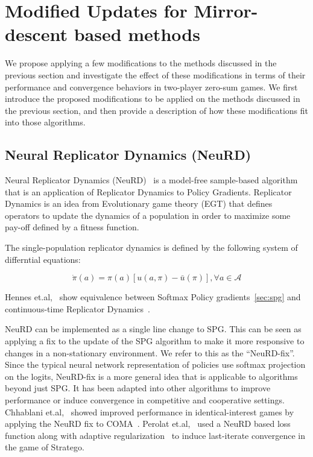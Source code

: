 \chapter{Modified Updates for Mirror-descent based methods}

We propose applying a few modifications to the methods discussed in the previous section and
investigate the effect of these modifications in terms of their performance and convergence
behaviors in two-player zero-sum games.
We first introduce the proposed modifications to be applied on the methods discussed in the
previous section, and then provide a description of how these modifications fit into those
algorithms.

\section{Neural Replicator Dynamics (NeuRD)}
Neural Replicator Dynamics (NeuRD)~\cite{hennesNeural2020} is a model-free sample-based algorithm
that is an application of Replicator Dynamics to Policy Gradients.
Replicator Dynamics is an idea from Evolutionary game theory (EGT) that defines operators to update
the dynamics of a population in order to maximize some pay-off defined by a fitness function.

The single-population replicator dynamics is defined by the following system of differntial
equations:

\begin{equation}
	\label{eqn:rd} \dot{\pi}(a) = \pi(a)[u(a, \pi) -
		\bar{u}(\pi)], \forall a \in \mathcal{A}
\end{equation}

Hennes
et.al,~\cite{hennesNeural2020} show equivalence between Softmax Policy gradients~\ref{sec:spg} and
continuous-time Replicator Dynamics~\cite[THEOREM 1, on p5]{hennesNeural2020}\label{thm:spgrd}.

NeuRD can be implemented as a single line change to SPG.
This can be seen as applying a fix to the update of the SPG algorithm to make it more responsive to
changes in a non-stationary environment.
We refer to this as the ``NeuRD-fix''.
Since the typical neural network representation of policies use softmax projection on the logits,
NeuRD-fix is a more general idea that is applicable to algorithms beyond just SPG.
It has been adapted into other algorithms to improve performance or induce convergence in
competitive and cooperative settings.
Chhablani et.al,~\cite{chhablaniCounterfactual2021} showed improved performance in
identical-interest games by applying the NeuRD fix to COMA~\cite{foersterCounterfactual2018}.
Perolat et.al,~\cite{perolatMastering2022} used a NeuRD based loss function along with adaptive
regularization~\cite{perolatPoincare2021} to induce last-iterate convergence in the game of
Stratego.

